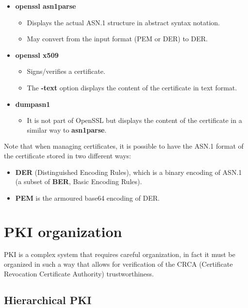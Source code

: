 \begin{itemize}
  \item \textbf{openssl asn1parse}
    \begin{itemize}
      \item Displays the actual ASN.1 structure in abstract 
        syntax notation.
      \item May convert from the input format (PEM or DER) 
        to DER.
    \end{itemize}
  \item \textbf{openssl x509}
    \begin{itemize}
      \item Signs/verifies a certificate.
      \item The \textbf{-text} option displays the content 
        of the certificate in text format.
    \end{itemize}
  \item \textbf{dumpasn1}
    \begin{itemize}
      \item It is not part of OpenSSL but displays the content 
        of the certificate in a similar way to \textbf{asn1parse}.
    \end{itemize}
\end{itemize}

Note that when managing certificates, it is possible to have the 
ASN.1 format of the certificate stored in two different ways:

\begin{itemize}
  \item \textbf{DER} (Distinguished Encoding Rules), which is a 
    binary encoding of ASN.1 (a subset of \textbf{BER}, Basic 
    Encoding Rules).
  \item \textbf{PEM} is the armoured base64 encoding of DER.
\end{itemize}

\section{PKI organization}
PKI is a complex system that requires careful organization, in fact it
must be organized in such a way that allows for verification of the 
CRCA (Certificate Revocation Certificate Authority) trustworthiness.

\subsection{Hierarchical PKI}

